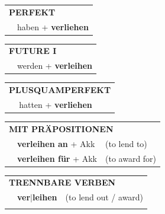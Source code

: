 \documentclass[10pt,a4paper]{revtex4-2}
\begin{document}
\begin{verbbox}
 \begin{tabular}{rl}
     \multicolumn{2}{l}{\textbf{PERFEKT}}\\
   & haben + \textbf{verliehen}\\
  \end{tabular}
\hfill
\begin{tabular}{rl}
    \multicolumn{2}{l}{\textbf{FUTURE I}}\\
   & werden + \textbf{verleihen}\\
  \end{tabular}
\hfill
\begin{tabular}{rl}
    \multicolumn{2}{l}{\textbf{PLUSQUAMPERFEKT}}\\
   & hatten + \textbf{verliehen}\\
  \end{tabular}

 \vspace{10pt}

\begin{tabular}{lll}
      \multicolumn{3}{l}{\textbf{MIT PRÄPOSITIONEN}}\\
& \textbf{verleihen an} + Akk & (to lend to)\\
& \textbf{verleihen für} + Akk & (to award for)\\
\end{tabular}
  \hfill
\begin{tabular}{lll}
      \multicolumn{3}{l}{\textbf{TRENNBARE VERBEN}}\\
 & \textbf{ver$|$leihen} & (to lend out / award)\\
\vspace{10pt}
  \end{tabular}


\vspace{-5pt}
\end{verbbox}
\end{document}
